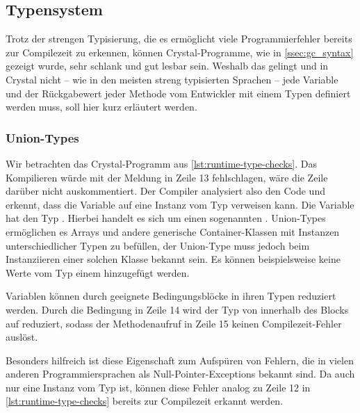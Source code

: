 \subsection{Typensystem}
\label{ssec:gc_typensystem}

Trotz der strengen Typisierung, die es ermöglicht viele Programmierfehler
bereits zur Compilezeit zu erkennen, können Crystal-Programme, wie in
\cref{ssec:gc_syntax} gezeigt wurde, sehr schlank und gut lesbar sein.  Weshalb
das gelingt und in Crystal nicht -- wie in den meisten streng typisierten
Sprachen -- jede Variable und der Rückgabewert jeder Methode vom Entwickler mit
einem Typen definiert werden muss, soll hier kurz erläutert werden.

\subsubsection{Union-Types}
\label{sssec:gct_union_types}

Wir betrachten das Crystal-Programm aus \cref{lst:runtime-type-checks}.  Das
Kompilieren würde mit der Meldung in Zeile 13 fehlschlagen, wäre die Zeile
darüber nicht auskommentiert.  Der Compiler analysiert also den Code und
erkennt, dass die Variable  auf eine Instanz vom Typ 
verweisen kann.  Die Variable hat den Typ .  Hierbei handelt
es sich um einen sogenannten .  Union-Types
ermöglichen es Arrays und andere generische Container-Klassen mit Instanzen
unterschiedlicher Typen zu befüllen, der Union-Type muss jedoch beim
Instanziieren einer solchen Klasse bekannt sein.  Es können beispielsweise
keine Werte vom Typ  einem  hinzugefügt
werden.

Variablen können durch geeignete Bedingungsblöcke in ihren Typen reduziert
werden.  Durch die Bedingung in Zeile 14 wird der Typ von  innerhalb
des Blocks auf  reduziert, sodass der Methodenaufruf in
Zeile 15 keinen Compilezeit-Fehler auslöst.

Besonders hilfreich ist diese Eigenschaft zum Aufspüren von Fehlern, die in
vielen anderen Programmiersprachen als Null-Pointer-Exceptions bekannt sind.  Da
 auch nur eine Instanz vom Typ  ist, können diese Fehler
analog zu Zeile 12 in \cref{lst:runtime-type-checks} bereits zur Compilezeit erkannt
werden.



